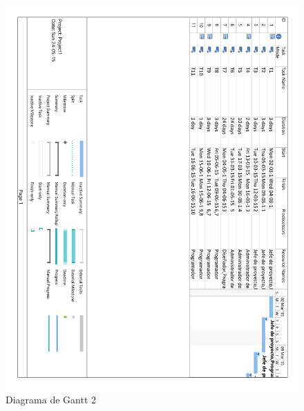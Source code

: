\begin{figure}[!htp]
	\centering
	\includegraphics[page=2, scale=.7]{fig/gantt_diagram}
	\caption{Diagrama de Gantt 2}
\end{figure}

